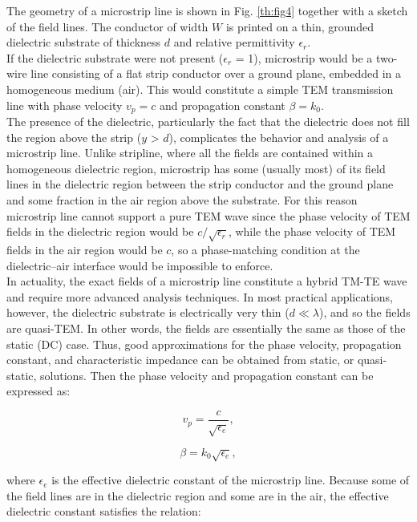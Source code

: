 \indent The geometry of a microstrip line is shown in Fig. \ref{th:fig4} together with a sketch of the field lines. The conductor of width $W$ is printed on a thin, grounded dielectric substrate of thickness $d$ and relative permittivity $\epsilon _{r}$. 
\\
\indent If the dielectric substrate were not present ($\epsilon _{r}$ = 1), microstrip would be a two-wire line consisting of a flat strip conductor over a ground plane, embedded in a homogeneous medium (air). This would constitute a simple TEM transmission line with phase velocity $v_{p} = c$ and propagation constant $\beta = k_0$. 
\\
\indent The presence of the dielectric, particularly the fact that the dielectric does not fill the region above the strip ($y$ > $d$), complicates the behavior and analysis of a microstrip line. Unlike stripline, where all the fields are contained within a homogeneous dielectric region, microstrip has some (usually most) of its field lines in the dielectric region between the strip conductor and the ground plane and some fraction in the air region above the substrate. For this reason microstrip line cannot support a pure TEM wave since the phase velocity of TEM fields in the dielectric region would be $c/\sqrt{\epsilon _{r}}$, while the phase velocity of TEM fields in the air region would be $c$, so a phase-matching condition at the dielectric–air interface would be impossible to enforce.
\\
\indent In actuality, the exact fields of a microstrip line constitute a hybrid TM-TE wave and require more advanced analysis techniques. In most practical applications, however, the dielectric substrate is electrically very thin ($d \ll \lambda $), and so the fields are quasi-TEM. In other words, the fields are essentially the same as those of the static (DC) case. Thus, good approximations for the phase velocity, propagation constant, and characteristic impedance can be obtained from static, or quasi-static, solutions.
Then the phase velocity and propagation constant can be expressed as:

\begin{equation}\label{th:eq32}
v_{p}=\frac{c}{\sqrt{\epsilon _{e}}},
\end{equation}

\begin{equation}\label{th:eq33}
\beta = k_{0}\sqrt{\epsilon _{e}},
\end{equation}

\noindent where $\epsilon _{e}$ is the effective dielectric constant of the microstrip line. Because some of the
field lines are in the dielectric region and some are in the air, the effective dielectric constant satisfies the relation:


